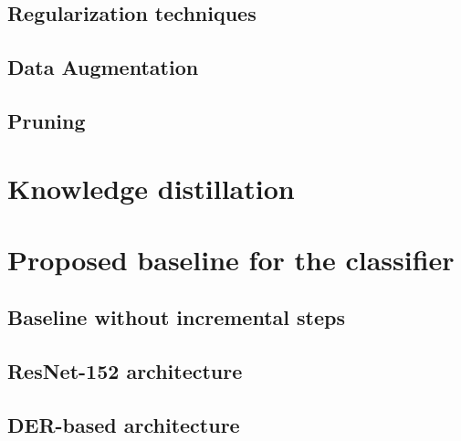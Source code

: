 \label{sec:method-classifier}
\subsection{Regularization techniques}
\subsection{Data Augmentation}
\subsection{Pruning}
\label{sec:method-pruning}
\section{Knowledge distillation}

\label{sec:method-kd}
\section{Proposed baseline for the classifier}
\label{sec:method-baseline}
\subsection{Baseline without incremental steps}
\subsection{ResNet-152 architecture}
\subsection{DER-based architecture}